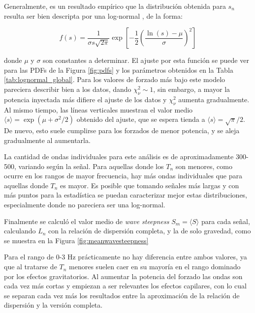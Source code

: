 Generalmente, es un resultado empírico que la distribución obtenida para $s_n$ resulta ser bien descripta por una log-normal \cite{tayfunDistributionsWaveSteepness2006}, de la forma: %

\begin{equation}
	f(s) = \frac{1}{\sigma s\sqrt{2\pi}} \exp\left[-\frac{1}{2}\left(\frac{\ln{(s)}-\mu}{\sigma}\right)^2\right] %
	\label{eq:log-normal} 
\end{equation} 

%  


\noindent donde $\mu$ y $\sigma$ son constantes a determinar. El ajuste por esta función se puede ver para las PDFs de la Figura \ref{fig:pdfs} y los parámetros obtenidos en la Tabla \ref{tab:lognormal_global}. Para los valores de forzado más bajo este modelo pareciera describir bien a los datos, dando $\chi_\nu^2\sim1$, sin embargo, a mayor la potencia inyectada más difiere el ajuste de los datos y $\chi_\nu^2$ aumenta gradualmente. Al mismo tiempo, las líneas verticales muestran el valor medio $\langle s\rangle=\exp(\mu+\sigma^2/2)$ obtenido del ajuste, que se espera tienda a $\langle s\rangle=\sqrt{\pi}/2$. De nuevo, esto suele cumplirse para los forzados de menor potencia, y se aleja gradualmente al aumentarla. %









La cantidad de ondas individuales para este análisis es de aproximadamente 300-500, variando según la señal. Para aquellas donde los $T_n$ son menores, como ocurre en los rangos de mayor frecuencia, hay más ondas individuales que para aquellas donde $T_n$ es mayor. Es posible que tomando señales más largas y con más puntos para la estadística se puedan caracterizar mejor estas distribuciones, especialmente donde no pareciera ser una log-normal. 

Finalmente se calculó el valor medio de \textit{wave steepness} $S_m=\langle S \rangle$ para cada señal, calculando $L_n$ con la relación de dispersión completa, y la de solo gravedad, como se muestra en la Figura \ref{fig:meanwavesteepness} 


Para el rango de 0-3 Hz prácticamente no hay diferencia entre ambos valores, ya que al tratarse de $T_n$ menores suelen caer en su mayoría en el rango dominado por los efectos gravitatorios. Al aumentar la potencia del forzado las ondas son cada vez más cortas y empiezan a ser relevantes los efectos capilares, con lo cual se separan cada vez más los resultados entre la aproximación de la relación de dispersión y la versión completa. 


